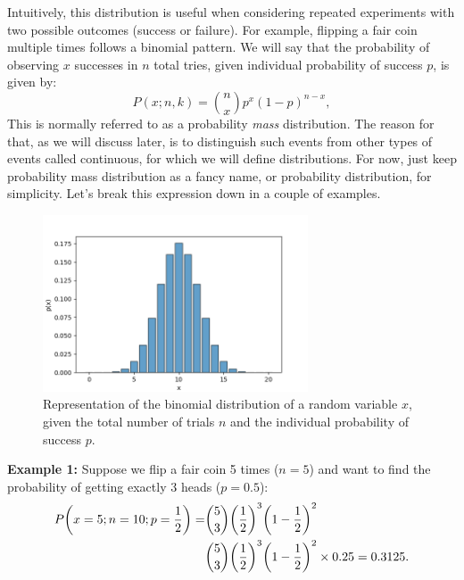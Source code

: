 \documentclass{book}
\begin{document}
Intuitively, this distribution is useful when considering repeated experiments with two possible outcomes (success or failure). For example, flipping a fair coin multiple times follows a binomial pattern. We will say that the probability of observing $x$ successes in $n$ total tries, given individual probability of success $p$, is given by:
\begin{equation}
    P(x; n, k) = \binom{n}{x} p^x (1-p)^{n-x},
\end{equation}
This is normally referred to as a probability \textit{mass} distribution. The reason for that, as we will discuss later, is to distinguish such events from other types of events called continuous, for which we will define  distributions. For now, just keep probability mass distribution as a fancy name, or probability distribution, for simplicity. Let's break this expression down in a couple of examples.

\begin{figure}[ht]
    \centering
    \includegraphics[width=0.7\textwidth]{figures/chapter2/binomial.png}
    \caption{Representation of the binomial distribution of a random variable $x$, given the total number of trials $n$ and the individual probability of success $p$.}
    \label{fig:binomial1}
\end{figure}

\textbf{Example 1:} Suppose we flip a fair coin 5 times ($n=5$) and want to find the probability of getting exactly 3 heads ($p=0.5$):
\begin{align}
    P\bigg(x=5; n = 10; p = \frac{1}{2}\bigg) = &\binom{5}{3} \bigg(\frac{1}{2}\bigg)^3 \bigg(1 - \frac{1}{2}\bigg)^2  \notag \\
    &\binom{5}{3} \bigg(\frac{1}{2}\bigg)^3 \bigg(1 - \frac{1}{2}\bigg)^2  \notag \times 0.25 = 0.3125.
\end{align}\\
\end{document}
